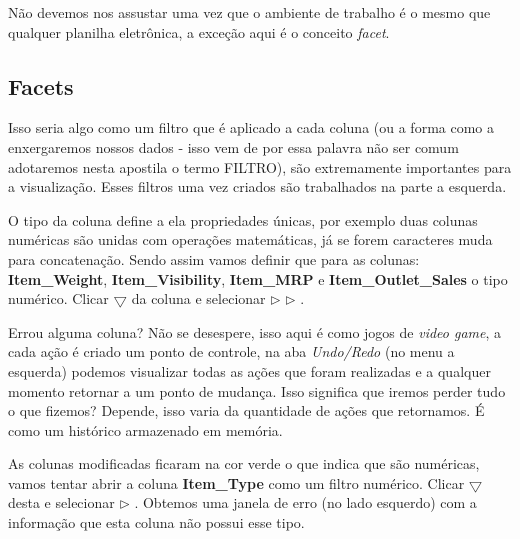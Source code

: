 \documentclass[a4paper,11pt]{article}
\begin{document}
Não devemos nos assustar uma vez que o ambiente de trabalho é o mesmo que qualquer planilha eletrônica, a exceção aqui é o conceito \textit{facet}. 

\subsection{Facets}
Isso seria algo como um filtro que é aplicado a cada coluna (ou a forma como a enxergaremos nossos dados - isso vem de  por essa palavra não ser comum adotaremos nesta apostila o termo FILTRO), são extremamente importantes para a visualização. Esses filtros uma vez criados são trabalhados na parte a esquerda. 

O tipo da coluna define a ela propriedades únicas, por exemplo duas colunas numéricas são unidas com operações matemáticas, já se forem caracteres muda para concatenação. Sendo assim vamos definir que para as colunas: \textbf{Item\_Weight}, \textbf{Item\_Visibility}, \textbf{Item\_MRP} e \textbf{Item\_Outlet\_Sales} o tipo numérico. Clicar $\bigtriangledown$ da coluna e selecionar  $\triangleright$  $\triangleright$ .

Errou alguma coluna? Não se desespere, isso aqui é como jogos de \textit{video game}, a cada ação é criado um ponto de controle, na aba \textit{Undo/Redo} (no menu a esquerda) podemos visualizar todas as ações que foram realizadas e a qualquer momento retornar a um ponto de mudança. Isso significa que iremos perder tudo o que fizemos? Depende, isso varia da quantidade de ações que retornamos. É como um histórico armazenado em memória.

As colunas modificadas ficaram na cor verde o que indica que são numéricas, vamos tentar abrir a coluna \textbf{Item\_Type} como um filtro numérico. Clicar $\bigtriangledown$ desta e selecionar  $\triangleright$ . Obtemos uma janela de erro (no lado esquerdo) com a informação que esta coluna não possui esse tipo.
\end{document}
